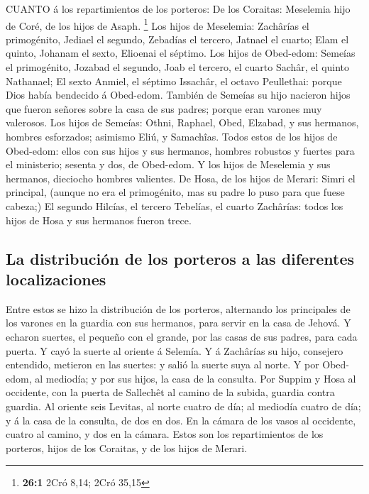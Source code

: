  CUANTO á los repartimientos de los porteros: De los
Coraitas: Meselemia hijo de Coré, de los hijos de Asaph. \footnote{\textbf{26:1}
  2Cró 8,14; 2Cró 35,15}  Los hijos de Meselemia: Zachârías
el primogénito, Jediael el segundo, Zebadías el tercero, Jatnael el
cuarto;  Elam el quinto, Johanam el sexto, Elioenai el
séptimo.  Los hijos de Obed-edom: Semeías el primogénito,
Jozabad el segundo, Joab el tercero, el cuarto Sachâr, el quinto
Nathanael;  El sexto Anmiel, el séptimo Issachâr, el octavo
Peullethai: porque Dios había bendecido á Obed-edom. 
También de Semeías su hijo nacieron hijos que fueron señores sobre la
casa de sus padres; porque eran varones muy valerosos.  Los
hijos de Semeías: Othni, Raphael, Obed, Elzabad, y sus hermanos, hombres
esforzados; asimismo Eliú, y Samachîas.  Todos estos de los
hijos de Obed-edom: ellos con sus hijos y sus hermanos, hombres robustos
y fuertes para el ministerio; sesenta y dos, de Obed-edom. 
Y los hijos de Meselemia y sus hermanos, dieciocho hombres valientes.
 De Hosa, de los hijos de Merari: Simri el principal,
(aunque no era el primogénito, mas su padre lo puso para que fuese
cabeza;)  El segundo Hilcías, el tercero Tebelías, el
cuarto Zachârías: todos los hijos de Hosa y sus hermanos fueron trece.

\hypertarget{la-distribuciuxf3n-de-los-porteros-a-las-diferentes-localizaciones}{%
\subsection{La distribución de los porteros a las diferentes
localizaciones}\label{la-distribuciuxf3n-de-los-porteros-a-las-diferentes-localizaciones}}

 Entre estos se hizo la distribución de los porteros,
alternando los principales de los varones en la guardia con sus
hermanos, para servir en la casa de Jehová.  Y echaron
suertes, el pequeño con el grande, por las casas de sus padres, para
cada puerta.  Y cayó la suerte al oriente á Selemía. Y á
Zachârías su hijo, consejero entendido, metieron en las suertes: y salió
la suerte suya al norte.  Y por Obed-edom, al mediodía; y
por sus hijos, la casa de la consulta.  Por Suppim y Hosa
al occidente, con la puerta de Sallechêt al camino de la subida, guardia
contra guardia.  Al oriente seis Levitas, al norte cuatro
de día; al mediodía cuatro de día; y á la casa de la consulta, de dos en
dos.  En la cámara de los vasos al occidente, cuatro al
camino, y dos en la cámara.  Estos son los repartimientos
de los porteros, hijos de los Coraitas, y de los hijos de Merari.

